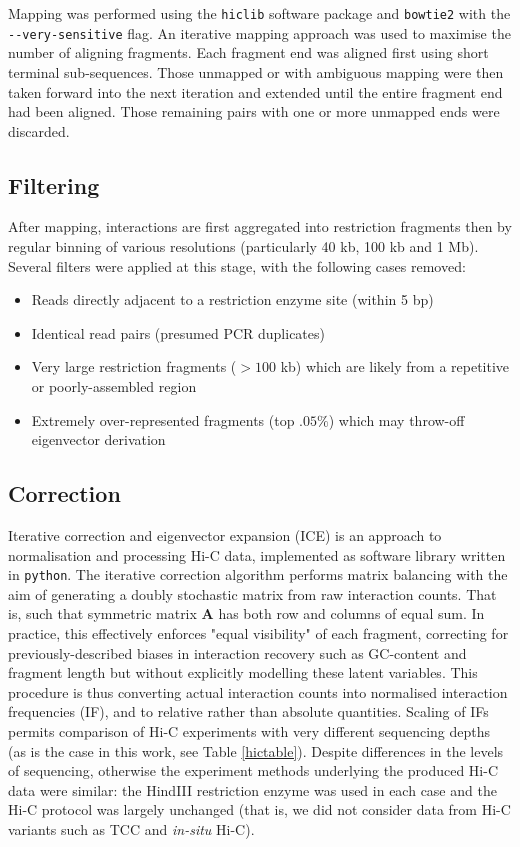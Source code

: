\documentclass[a4paper,10pt,oneside]{book}
\begin{document}
Mapping was performed using the \texttt{hiclib} software
package\citep{Imakaev2012} and \texttt{bowtie2}\citep{Langmead2012} with
the \texttt{-{}-very-sensitive} flag. An iterative mapping approach was used to maximise the number of aligning fragments.\cite{Imakaev2012} Each fragment end was aligned first using short terminal sub-sequences. Those unmapped or with ambiguous mapping were then taken forward into the next iteration and extended until the entire fragment end had been aligned. Those remaining pairs with one or more unmapped ends were discarded.

\subsection{Filtering}\label{methods:filtering}

After mapping, interactions are first aggregated into restriction fragments then by regular binning of various resolutions (particularly 40 kb, 100 kb and 1 Mb). Several filters were applied at this stage, with the following cases removed:\cite{Imakaev2012} 
\begin{itemize}
\item Reads directly adjacent to a restriction enzyme site (within 5 bp)
\item Identical read pairs (presumed PCR duplicates)
\item Very large restriction fragments ($>100$ kb) which are likely from a repetitive or poorly-assembled region
\item Extremely over-represented fragments (top $.05\%$) which may throw-off eigenvector derivation
\end{itemize}

\subsection{Correction}\label{methods:correction}

Iterative correction and eigenvector expansion (ICE) is an approach to normalisation and processing Hi-C data, implemented as software library written in \texttt{python}.\citep{Imakaev2012} The iterative correction algorithm performs matrix balancing with the aim of generating a doubly stochastic matrix from raw interaction counts. That is, such that symmetric matrix $\mathbf{A}$ has both row and columns of equal sum. In practice, this effectively enforces "equal visibility" of each fragment, correcting for previously-described biases in interaction recovery such as GC-content and fragment length\cite{Yaffe2011} but without explicitly modelling these latent variables. This procedure is thus converting actual interaction counts into normalised interaction frequencies (IF), and to relative rather than absolute quantities. Scaling of IFs permits comparison of Hi-C experiments with very different sequencing depths (as is the case in this work, see Table \ref{hictable}). Despite differences in the levels of sequencing, otherwise the experiment methods underlying the produced Hi-C data were similar: the HindIII restriction enzyme was used in each case and the Hi-C protocol was largely unchanged (that is, we did not consider data from Hi-C variants such as TCC\cite{Kalhor2012} and \emph{in-situ} Hi-C\cite{Rao2014}).
\end{document}
